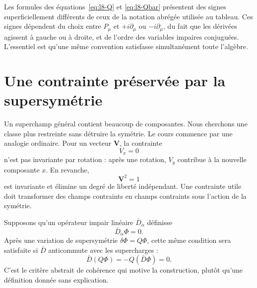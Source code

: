 Les formules des équations~\eqref{eq:l8-Q} et \eqref{eq:l8-Qbar} présentent des signes superficiellement différents de ceux de la notation abrégée utilisée au tableau. Ces signes dépendent du choix entre \(P_\mu\) et \(+i\partial_\mu\) ou \(-i\partial_\mu\), du fait que les dérivées agissent à gauche ou à droite, et de l’ordre des variables impaires conjuguées. L’essentiel est qu’une même convention satisfasse simultanément toute l’algèbre.

\section{Une contrainte préservée par la supersymétrie}

Un superchamp général contient beaucoup de composantes. Nous cherchons une classe plus restreinte sans détruire la symétrie. Le cours commence par une analogie ordinaire. Pour un vecteur \(\mathbf V\), la contrainte
\begin{equation}
V_x=0
\end{equation}
n’est pas invariante par rotation : après une rotation, \(V_y\) contribue à la nouvelle composante \(x\). En revanche,
\begin{equation}
\mathbf V^2=1
\end{equation}
est invariante et élimine un degré de liberté indépendant. Une contrainte utile doit transformer des champs contraints en champs contraints sous l’action de la symétrie.

Supposons qu’un opérateur impair linéaire \(\bar D_{\dot\alpha}\) définisse
\begin{equation}
\bar D_{\dot\alpha}\Phi=0.
\label{eq:l8-chiral-constraint}
\end{equation}
Après une variation de supersymétrie \(\delta\Phi=Q\Phi\), cette même condition sera satisfaite si \(\bar D\) anticommute avec les supercharges :
\begin{equation}
\bar D(Q\Phi)=-Q(\bar D\Phi)=0.
\end{equation}
C’est le critère abstrait de cohérence qui motive la construction, plutôt qu’une définition donnée sans explication.

\begin{classroomqa}
\end{classroomqa}

